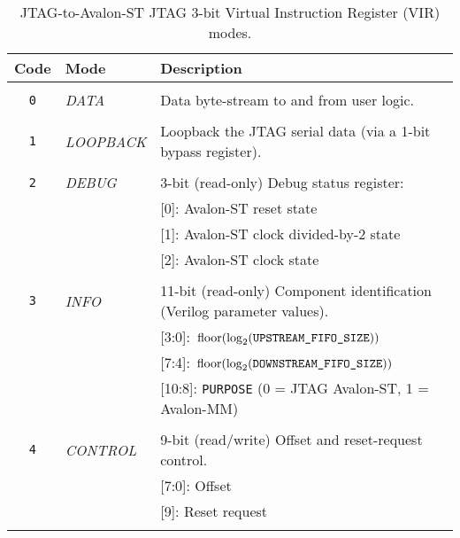 \documentclass[10pt,twoside]{article}
\newcommand{\floor}{\ensuremath{\,\text{floor}}}
\begin{document}
%
\begin{table}[p]
\caption{JTAG-to-Avalon-ST JTAG 3-bit Virtual Instruction Register (VIR) modes.}
\label{tab:jtag_to_avalon_st_vir_codes}
\begin{center}
\begin{tabular}{|c|l|p{10cm}|}
\hline
Code & Mode & Description\\
\hline\hline
&&\\
\verb+0+ & {\em DATA}     & Data byte-stream to and from user logic.\\
&&\\
\verb+1+ & {\em LOOPBACK} & Loopback the JTAG serial data (via a 1-bit bypass register).\\
&&\\
\verb+2+ & {\em DEBUG}    & 3-bit (read-only) Debug status register:\\
         &                & [0]: Avalon-ST reset state\\
         &                & [1]: Avalon-ST clock divided-by-2 state\\
         &                & [2]: Avalon-ST clock state\\
&&\\
\verb+3+ & {\em INFO}     & 11-bit (read-only) Component identification (Verilog parameter values).\\
         &                & [3:0]: $\floor(\log_2(\text{\tt UPSTREAM\_FIFO\_SIZE}))$\\
         &                & [7:4]: $\floor(\log_2(\text{\tt DOWNSTREAM\_FIFO\_SIZE}))$\\
         &                & [10:8]: {\tt PURPOSE} (0 = JTAG Avalon-ST, 1 = Avalon-MM)\\
&&\\
\verb+4+ & {\em CONTROL}  & 9-bit (read/write) Offset and reset-request control.\\
         &                & [7:0]: Offset\\
         &                & [9]: Reset request\\
&&\\
\hline
\end{tabular}
\end{center}
\end{table}
\end{document}
